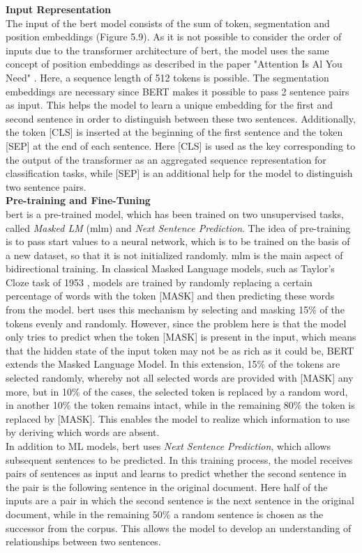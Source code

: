 \documentclass[a4paper, 11pt,titlepage,oneside,openany]{book}
\begin{document}
\noindent \textbf{Input Representation} \\
\noindent The input of the \gls{bert} model consists of the sum of token, segmentation and position embeddings (Figure 5.9). As it is not possible to consider the order of inputs due to the transformer architecture of \gls{bert}, the model uses the same concept of position embeddings as described in the paper "Attention Is Al You Need" \cite{attention}. Here, a sequence length of 512 tokens is possible. The segmentation embeddings are necessary since BERT makes it possible to pass 2 sentence pairs as input. This helps the model to learn a unique embedding for the first and second sentence in order to distinguish between these two sentences.  Additionally, the token [CLS] is inserted at the beginning of the first sentence and the token [SEP] at the end of each sentence. Here [CLS] is used as the key corresponding to the output of the transformer as an aggregated sequence representation for classification tasks, while [SEP] is an additional help for the model to distinguish two sentence pairs.\\

\noindent \textbf{Pre-training and Fine-Tuning}\\
\noindent \gls{bert} is a pre-trained model, which has been trained on two unsupervised tasks, called \textit{Masked LM} (\gls{mlm}) and \textit{Next Sentence Prediction}. The idea of pre-training is to pass start values to a neural network, which is to be trained on the basis of a new dataset, so that it is not initialized randomly.
\newpage
\indent \gls{mlm} is the main aspect of bidirectional training. In classical Masked Language models, such as Taylor's Cloze task of 1953 \cite{cloze}, models are trained by randomly replacing a certain percentage of words with the token [MASK] and then predicting these words from the model. \gls{bert} uses this mechanism by selecting and masking 15\% of the tokens evenly and randomly. However, since the problem here is that the model only tries to predict when the token [MASK] is present in the input, which means that the hidden state of the input token may not be as rich as it could be, BERT extends the Masked Language Model. In this extension, 15\% of the tokens are selected randomly, whereby not all selected words are provided with [MASK] any more, but in 10\% of the cases, the selected token is replaced by a random word, in another 10\% the token remains intact, while in the remaining 80\% the token is replaced by [MASK]. This enables the model to realize which information to use by deriving which words are absent.\\
\noindent In addition to ML models, \gls{bert} uses \textit{Next Sentence Prediction}, which allows subsequent sentences to be predicted. In this training process, the model receives pairs of sentences as input and learns to predict whether the second sentence in the pair is the following sentence in the original document. Here half of the inputs are a pair in which the second sentence is the next sentence in the original document, while in the remaining 50\% a random sentence is chosen as the successor from the corpus. This allows the model to develop an understanding of relationships between two sentences. \\
\end{document}
